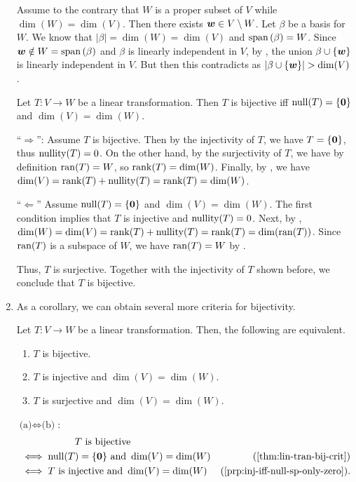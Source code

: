 \begin{enumerate}
\begin{pf}
Assume to the contrary that \(W\) is a proper subset of \(V\) while
\(\dim(W)=\dim(V)\). Then there exists \(\vb*{w}\in V\setminus W\).  Let
\(\beta\) be a basis for \(W\). We know that \(|\beta|=\dim(W)=\dim(V)\) and
\(\operatorname{span}\qty(\beta)=W\). Since \(\vb*{w}\notin W=\operatorname{span}\qty(\beta)\) and \(\beta\) is
linearly independent in \(V\), by , the union
\(\beta\cup\{\vb*{w}\}\) is linearly independent in \(V\). But then this
contradicts  as \(|\beta\cup\{\vect{w}\}|>\dim(V)\).
\end{pf}

\begin{theorem}
\label{thm:lin-tran-bij-crit}
Let \(T:V\to W\) be a linear transformation. Then \(T\) is bijective iff
\(\operatorname{null}(T)=\{\vb*{0}\}\) and \(\dim(V)=\dim(W)\).
\end{theorem}

\begin{pf}
``\(\Rightarrow\)'': Assume \(T\) is bijective. Then by the injectivity of
\(T\), we have \(\null{T}=\{\vect{0}\}\), thus \(\operatorname{nullity}(T)=0\). On the other
hand, by the surjectivity of \(T\), we have by definition \(\operatorname{ran}(T)=W\), so
\(\operatorname{rank}(T)=\dim(W)\). Finally, by , we have
\(\dim(V)=\operatorname{rank}(T)+\operatorname{nullity}(T)=\operatorname{rank}(T)=\dim(W)\).


``\(\Leftarrow\)'' Assume \(\operatorname{null}(T)=\{\vb*{0}\}\) and \(\dim(V)=\dim(W)\). The
first condition implies that \(T\) is injective and \(\operatorname{nullity}(T)=0\). Next, by
, \(\dim(W)=\dim(V)=\operatorname{rank}(T)+\operatorname{nullity}(T)=\operatorname{rank}(T)=\dim(\operatorname{ran}(T))\).
Since \(\operatorname{ran}(T)\) is a subspace of \(W\), we have \(\operatorname{ran}(T)=W\) by
.

Thus, \(T\) is surjective. Together with the injectivity of \(T\) shown
before, we conclude that \(T\) is bijective.
\end{pf}

\item As a corollary, we can obtain several more criteria for bijectivity.

\begin{corollary}
\label{cor:more-lt-bij-crit}
Let \(T:V\to W\) be a linear transformation. Then, the following are equivalent.
\begin{enumerate}
\item \(T\) is bijective.
\item \(T\) is injective and \(\dim(V)=\dim(W)\).
\item \(T\) is surjective and \(\dim(V)=\dim(W)\).
\end{enumerate}
\end{corollary}
\begin{pf}
\underline{\(\text{(a)}\iff\text{(b)}\)}:
\begin{align*}
&\hspace{2cm}\text{\(T\) is bijective} \\
&\iff\nul{T}=\{\vect{0}\}\text{ and }\dim(V)=\dim(W) &\text{(\Cref{thm:lin-tran-bij-crit})} \\
&\iff T\text{ is injective and }\dim(V)=\dim(W)&\text{(\Cref{prp:inj-iff-null-sp-only-zero})}.
\end{align*}


\end{pf}
\end{enumerate}

